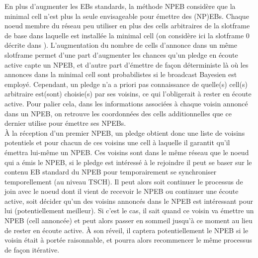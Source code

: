 \documentclass[]{report}
\begin{document}
En plus d'augmenter les EBs standards, la méthode NPEB considère que la minimal cell n'est plus la seule envisageable pour émettre des (NP)EBs. Chaque noeud membre du réseau peu utiliser en plus des cells arbitraires de la slotframe de base dans laquelle est installée la minimal cell (on considère ici la slotframe 0 décrite dans \cite{rfc8180}). L'augmentation du nombre de cells d'annonce dans un même slotframe permet d'une part d'augmenter les chances qu'un pledge en écoute active capte un NPEB, et d'autre part d'émettre de façon déterministe là où les annonces dans la minimal cell sont probabilistes si le broadcast Bayesien est employé. Cependant, un pledge n'a a priori pas connaissance de quelle(s) cell(s) arbitraire est(sont) choisie(s) par ses voisins, ce qui l'obligerait à rester en écoute active. Pour palier cela, dans les informations associées à chaque voisin annoncé dans un NPEB, on retrouve les coordonnées des cells additionnelles que ce dernier utilise pour émettre ses NPEBs.\\

À la réception d'un premier NPEB, un pledge obtient donc une liste de voisins potentiels et pour chacun de ces voisins une cell à laquelle il garantit qu'il émettra lui-même un NPEB. Ces voisins sont dans le même réseau que le noeud qui a émis le NPEB, si le pledge est intéressé à le rejoindre il peut se baser sur le contenu EB standard du NPEB pour temporairement se synchroniser temporellement (au niveau TSCH). Il peut alors soit continuer le processus de join avec le noeud dont il vient de recevoir le NPEB ou continuer une écoute active, soit décider qu'un des voisins annoncés dans le NPEB est intéressant pour lui (potentiellement meilleur). Si c'est le cas, il sait quand ce voisin va émettre un NPEB (cell annoncée) et peut alors passer en sommeil jusqu'à ce moment au lieu de rester en écoute active. À son réveil, il captera potentiellement le NPEB si le voisin était à portée raisonnable, et pourra alors recommencer le même processus de façon itérative.

\newpage
\end{document}
